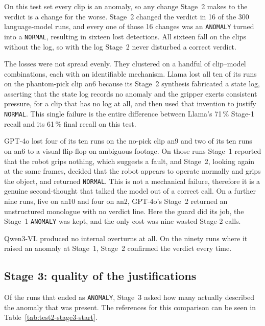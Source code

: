 \documentclass[11pt,a4paper]{article}
\begin{document}
On this test set every clip is an anomaly, so any change Stage~2 makes to
the verdict is a change for the worse. Stage~2 changed the verdict in 16
of the 300 language-model runs, and every one of those 16 changes was an
\texttt{ANOMALY} turned into a \texttt{NORMAL}, resulting in sixteen lost
detections. All sixteen fall on the clips without the log, so with the log
Stage~2 never disturbed a correct verdict.

The losses were not spread evenly. They clustered on a handful of
clip--model combinations, each with an identifiable mechanism. Llama lost
all ten of its runs on the phantom-pick clip an6 because its Stage~2
synthesis fabricated a state log, asserting that the state log records no
anomaly and the gripper exerts consistent pressure, for a clip that has no
log at all, and then used that invention to justify \texttt{NORMAL}. This
single failure is the entire difference between Llama's 71\,\% Stage-1
recall and its 61\,\% final recall on this test.

GPT-4o lost four of its ten runs on the no-pick clip an9 and two of its
ten runs on an6 to a visual flip-flop on ambiguous footage. On those runs
Stage~1 reported that the robot grips nothing, which suggests a fault, and
Stage~2, looking again at the same frames, decided that the robot appears
to operate normally and grips the object, and returned \texttt{NORMAL}.
This is not a mechanical failure, therefore it is a genuine second-thought
that talked the model out of a correct call. On a further nine runs, five
on an10 and four on an2, GPT-4o's Stage~2 returned an unstructured
monologue with no verdict line. Here the guard did its job, the Stage~1
\texttt{ANOMALY} was kept, and the only cost was nine wasted Stage-2
calls.

Qwen3-VL produced no internal overturns at all. On the ninety runs where
it raised an anomaly at Stage~1, Stage~2 confirmed the verdict every time.

\subsection{Stage 3: quality of the justifications}

Of the runs that ended as \texttt{ANOMALY}, Stage~3 asked how many
actually described the anomaly that was present. The references for this
comparison can be seen in Table~\ref{tab:test2-stage3-start}.
\end{document}
